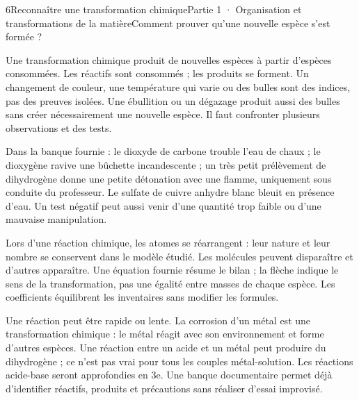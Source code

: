 \begin{ouverture}[college1]{6}{Reconnaître une transformation chimique}{Partie 1 · Organisation et transformations de la matière}{Comment prouver qu’une nouvelle espèce s’est formée ?}
\end{ouverture}
\label{ess-6}
Une transformation chimique produit de nouvelles espèces à partir d’espèces consommées. Les réactifs sont consommés ; les produits se forment. Un changement de couleur, une température qui varie ou des bulles sont des indices, pas des preuves isolées. Une ébullition ou un dégazage produit aussi des bulles sans créer nécessairement une nouvelle espèce. Il faut confronter plusieurs observations et des tests.\par
{}
Dans la banque fournie : le dioxyde de carbone trouble l’eau de chaux ; le dioxygène ravive une bûchette incandescente ; un très petit prélèvement de dihydrogène donne une petite détonation avec une flamme, uniquement sous conduite du professeur. Le sulfate de cuivre anhydre blanc bleuit en présence d’eau. Un test négatif peut aussi venir d’une quantité trop faible ou d’une mauvaise manipulation.\par
\clearpage
{}
Lors d’une réaction chimique, les atomes se réarrangent : leur nature et leur nombre se conservent dans le modèle étudié. Les molécules peuvent disparaître et d’autres apparaître. Une équation fournie résume le bilan ; la flèche indique le sens de la transformation, pas une égalité entre masses de chaque espèce. Les coefficients équilibrent les inventaires sans modifier les formules.\par
{}
Une réaction peut être rapide ou lente. La corrosion d’un métal est une transformation chimique : le métal réagit avec son environnement et forme d’autres espèces. Une réaction entre un acide et un métal peut produire du dihydrogène ; ce n’est pas vrai pour tous les couples métal-solution. Les réactions acide-base seront approfondies en 3e. Une banque documentaire permet déjà d’identifier réactifs, produits et précautions sans réaliser d’essai improvisé.\par
